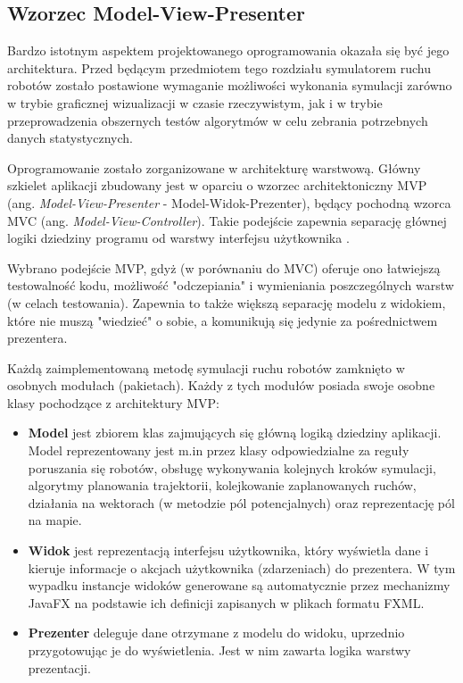 \subsection{Wzorzec Model-View-Presenter}
Bardzo istotnym aspektem projektowanego oprogramowania okazała się być jego architektura. Przed będącym przedmiotem tego rozdziału symulatorem ruchu robotów zostało postawione wymaganie możliwości wykonania symulacji zarówno w trybie graficznej wizualizacji w czasie rzeczywistym, jak i w trybie przeprowadzenia obszernych testów algorytmów w celu zebrania potrzebnych danych statystycznych.

Oprogramowanie zostało zorganizowane w architekturę warstwową.
Główny szkielet aplikacji zbudowany jest w oparciu o wzorzec architektoniczny MVP (ang. {\it Model-View-Presenter} - Model-Widok-Prezenter), będący pochodną wzorca MVC (ang. {\it Model-View-Controller}).
Takie podejście zapewnia separację głównej logiki dziedziny programu od warstwy interfejsu użytkownika \cite{mvp}.

Wybrano podejście MVP, gdyż (w porównaniu do MVC) oferuje ono łatwiejszą testowalność kodu, możliwość "odczepiania" i wymieniania poszczególnych warstw (w celach testowania). Zapewnia to także większą separację modelu z widokiem, które nie muszą "wiedzieć" o sobie, a komunikują się jedynie za pośrednictwem prezentera.

Każdą zaimplementowaną metodę symulacji ruchu robotów zamknięto w osobnych modułach (pakietach). Każdy z tych modułów posiada swoje osobne klasy pochodzące z architektury MVP:
\begin{itemize}
	\item {\bf Model} jest zbiorem klas zajmujących się główną logiką dziedziny aplikacji. Model reprezentowany jest m.in przez klasy odpowiedzialne za reguły poruszania się robotów, obsługę wykonywania kolejnych kroków symulacji, algorytmy planowania trajektorii, kolejkowanie zaplanowanych ruchów, działania na wektorach (w metodzie pól potencjalnych) oraz reprezentację pól na mapie.
	\item {\bf Widok} jest reprezentacją interfejsu użytkownika, który wyświetla dane i kieruje informacje o akcjach użytkownika (zdarzeniach) do prezentera. W tym wypadku instancje widoków generowane są automatycznie przez mechanizmy JavaFX na podstawie ich definicji zapisanych w plikach formatu FXML.
	\item {\bf Prezenter} deleguje dane otrzymane z modelu do widoku, uprzednio przygotowując je do wyświetlenia. Jest w nim zawarta logika warstwy prezentacji.
\end{itemize}


